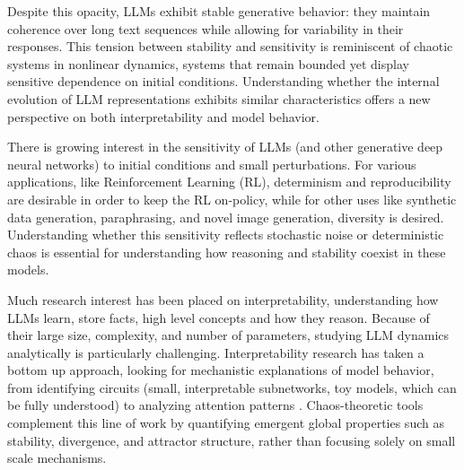\documentclass[a4paper,12pt]{article}
\begin{document}
    Despite this opacity, LLMs exhibit stable generative behavior: they maintain coherence over long text sequences while allowing for variability in their responses. This tension between stability and sensitivity is reminiscent of chaotic systems in nonlinear dynamics, systems that remain bounded yet display sensitive dependence on initial conditions. Understanding whether the internal evolution of LLM representations exhibits similar characteristics offers a new perspective on both interpretability and model behavior.

    There is growing interest in the sensitivity of LLMs (and other generative deep neural networks) to initial conditions and small perturbations. For various applications, like Reinforcement Learning (RL), determinism and reproducibility are desirable in order to keep the RL on-policy, while for other uses like synthetic data generation, paraphrasing, and novel image generation, diversity is desired. Understanding whether this sensitivity reflects stochastic noise or deterministic chaos is essential for understanding how reasoning and stability coexist in these models.



    Much research interest has been placed on interpretability, understanding how LLMs learn, store facts, high level concepts and how they reason. Because of their large size, complexity, and number of parameters, studying LLM dynamics analytically is particularly challenging.
    Interpretability research has taken a bottom up approach, looking for mechanistic explanations of model behavior, from identifying circuits (small, interpretable subnetworks, toy models, which can be fully understood) to analyzing attention patterns \cite{olah2020zoom, ameisen2025circuit, lindsey2025biology}. Chaos-theoretic tools complement this line of work by quantifying emergent global properties such as stability, divergence, and attractor structure, rather than focusing solely on small scale mechanisms. 
\end{document}
